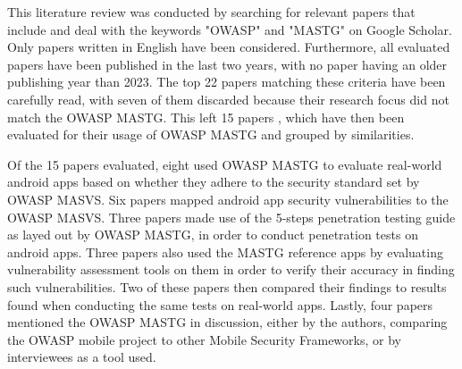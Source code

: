 This literature review was conducted by searching for relevant papers that include and deal with the keywords "OWASP" and "MASTG" on Google Scholar. Only papers written in English have been considered. Furthermore, all evaluated papers have been published in the last two years, with no paper having an older publishing year than 2023. The top 22 papers matching these criteria have been carefully read, with seven of them discarded because their research focus did not match the OWASP MASTG. This left 15 papers \citep{paper_01, paper_02, paper_03, paper_04, paper_05, paper_06, paper_07, paper_08, paper_10, paper_13, paper_14, paper_19, paper_20, paper_21, paper_22}, which have then been evaluated for their usage of OWASP MASTG and grouped by similarities.

Of the 15 papers evaluated, eight \citep{paper_01, paper_02, paper_03, paper_04, paper_05, paper_07, paper_13, paper_14} used OWASP MASTG to evaluate real-world android apps based on whether they adhere to the security standard set by OWASP MASVS. Six papers \citep{paper_01, paper_02, paper_03, paper_04, paper_05, paper_07} mapped android app security vulnerabilities to the OWASP MASVS. Three papers \citep{paper_03, paper_04, paper_06} made use of the 5-steps penetration testing guide as layed out by OWASP MASTG, in order to conduct penetration tests on android apps. Three papers \citep{paper_10, paper_19, paper_22} also used the MASTG reference apps by evaluating vulnerability assessment tools on them in order to verify their accuracy in finding such vulnerabilities. Two of these papers \citep{paper_19, paper_22} then compared their findings to results found when conducting the same tests on real-world apps. Lastly, four papers \citep{paper_08, paper_20, paper_21, paper_22} mentioned the OWASP MASTG in discussion, either by the authors, comparing the OWASP mobile project to other Mobile Security Frameworks, or by interviewees as a tool used.

